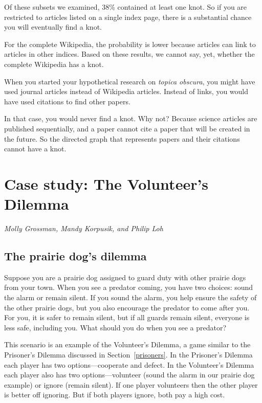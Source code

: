 \documentclass[10pt]{book}
\begin{document}
Of these subsets we examined, 38\% contained at least one knot. So if
you are restricted to articles listed on a single index page, there is
a substantial chance you will eventually find a knot.

For the complete Wikipedia, the probability is lower because
articles can link to articles in other indices.  Based on
these results, we cannot say, yet, whether the complete Wikipedia
has a knot.


When you started your hypothetical research on \emph{topica obscura},
you might have used journal articles instead of Wikipedia articles.
Instead of links, you would have used citations to find other papers.

In that case, you would never find a knot.  Why not? 
Because science articles are
published sequentially, and a paper cannot cite a paper that will be
created in the future.  So the directed graph that represents papers
and their citations cannot have a knot.



\chapter{Case study: The Volunteer's Dilemma}

{\em Molly Grossman, Mandy Korpusik, and Philip Loh}


\section{The prairie dog's dilemma}

Suppose you are a prairie dog assigned to guard duty with other
prairie dogs from your town.  When you see a predator coming, you have
two choices: sound the alarm or remain silent.  If you sound the
alarm, you help ensure the safety of the other prairie dogs, but you
also encourage the predator to come after you.  For you, it is safer
to remain silent, but if all guards remain silent, everyone is less
safe, including you.  What should you do when you see a predator?

This scenario is an example of the Volunteer's Dilemma, a game similar
to the Prisoner's Dilemma discussed in Section~\ref{prisoners}.  In
the Prisoner's Dilemma each player has two options---cooperate and
defect.  In the Volunteer's Dilemma each player also has two
options---volunteer (sound the alarm in our prairie dog example) or
ignore (remain silent).  If one player volunteers then the other
player is better off ignoring.  But if both players ignore, both pay a
high cost.
\end{document}
